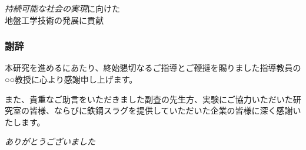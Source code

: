 \documentclass[unicode, 9pt, aspectratio=43]{beamer}
\begin{document}
\begin{refsection}
\begin{frame}
    \vspace{1.5em}

    \begin{center}
      \begin{minipage}{0.75\linewidth}
        \begin{block}{}
          \centering
          \Large
          \emph{持続可能な社会の実現}に向けた\\
          地盤工学技術の発展に貢献
        \end{block}
      \end{minipage}
    \end{center}
  \end{frame}

\end{refsection}

\printbibliographyframe%

\begin{frame}
  \frametitle{謝辞}
  \begin{center}
    \begin{minipage}{0.85\linewidth}
      本研究を進めるにあたり、終始懇切なるご指導とご鞭撻を賜りました指導教員の○○教授に心より感謝申し上げます。

      \vspace{1em}

      また、貴重なご助言をいただきました副査の先生方、実験にご協力いただいた研究室の皆様、ならびに鉄鋼スラグを提供していただいた企業の皆様に深く感謝いたします。

      \vspace{2em}

      \Large
      \emph{ありがとうございました}
    \end{minipage}
  \end{center}
\end{frame}

\appendix
\end{document}
